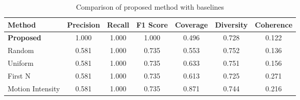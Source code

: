 \begin{table}[h]
\centering
\caption{Comparison of proposed method with baselines}
\label{tab:baseline_comparison}
\begin{tabular}{lcccccc}
\toprule
Method & Precision & Recall & F1 Score & Coverage & Diversity & Coherence \\
\midrule
\textbf{Proposed} & 1.000 & 1.000 & 1.000 & 0.496 & 0.728 & 0.122 \\
Random & 0.581 & 1.000 & 0.735 & 0.553 & 0.752 & 0.136 \\
Uniform & 0.581 & 1.000 & 0.735 & 0.633 & 0.751 & 0.156 \\
First N & 0.581 & 1.000 & 0.735 & 0.613 & 0.725 & 0.271 \\
Motion Intensity & 0.581 & 1.000 & 0.735 & 0.871 & 0.744 & 0.216 \\
\bottomrule
\end{tabular}
\end{table}
